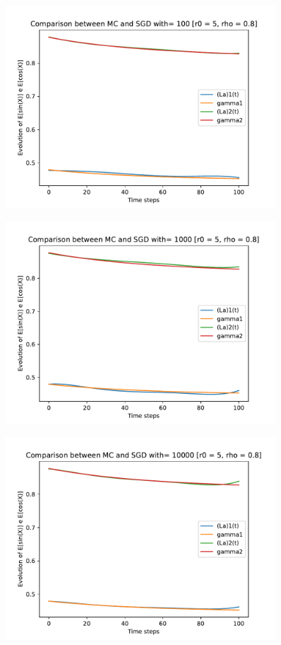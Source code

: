 \documentclass[a4paper,11pt,openright]{report}
\begin{document}
\begin{figure}[H]
\centering
\includegraphics[width=0.9\textwidth]{images/graphs T = 1/n = 5, M = 100 sine and cosine.pdf}
\end{figure}
\begin{figure}[H]
\centering
\includegraphics[width=0.9\textwidth]{images/graphs T = 1/n = 5, M = 1000 sine and cosine.pdf}
\end{figure}
\begin{figure}[H]
\centering
\includegraphics[width=0.9\textwidth]{images/graphs T = 1/n = 5, M = 10000 sine and cosine.pdf}
\end{figure}
\newpage
\end{document}
